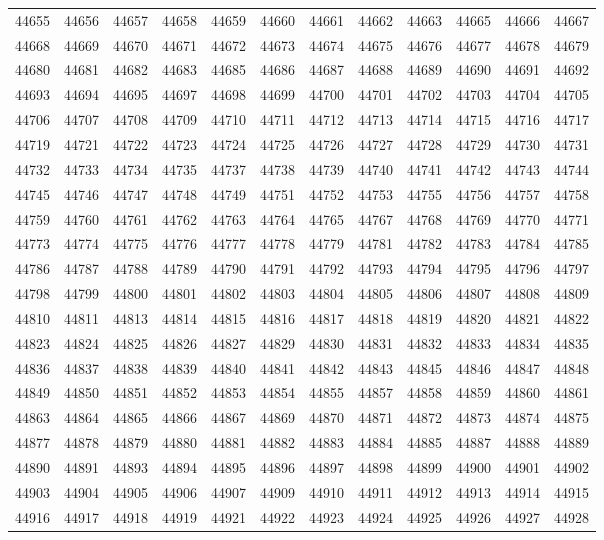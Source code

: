 \begin{center}
\begin{longtable}{llllllllllll}
44655 &44656 &44657 &44658 &44659 &44660 &44661 &44662 &44663 &44665 &44666 &44667 \\
44668 &44669 &44670 &44671 &44672 &44673 &44674 &44675 &44676 &44677 &44678 &44679 \\
44680 &44681 &44682 &44683 &44685 &44686 &44687 &44688 &44689 &44690 &44691 &44692 \\
44693 &44694 &44695 &44697 &44698 &44699 &44700 &44701 &44702 &44703 &44704 &44705 \\
44706 &44707 &44708 &44709 &44710 &44711 &44712 &44713 &44714 &44715 &44716 &44717 \\
44719 &44721 &44722 &44723 &44724 &44725 &44726 &44727 &44728 &44729 &44730 &44731 \\
44732 &44733 &44734 &44735 &44737 &44738 &44739 &44740 &44741 &44742 &44743 &44744 \\
44745 &44746 &44747 &44748 &44749 &44751 &44752 &44753 &44755 &44756 &44757 &44758 \\
44759 &44760 &44761 &44762 &44763 &44764 &44765 &44767 &44768 &44769 &44770 &44771 \\
44773 &44774 &44775 &44776 &44777 &44778 &44779 &44781 &44782 &44783 &44784 &44785 \\
44786 &44787 &44788 &44789 &44790 &44791 &44792 &44793 &44794 &44795 &44796 &44797 \\
44798 &44799 &44800 &44801 &44802 &44803 &44804 &44805 &44806 &44807 &44808 &44809 \\
44810 &44811 &44813 &44814 &44815 &44816 &44817 &44818 &44819 &44820 &44821 &44822 \\
44823 &44824 &44825 &44826 &44827 &44829 &44830 &44831 &44832 &44833 &44834 &44835 \\
44836 &44837 &44838 &44839 &44840 &44841 &44842 &44843 &44845 &44846 &44847 &44848 \\
44849 &44850 &44851 &44852 &44853 &44854 &44855 &44857 &44858 &44859 &44860 &44861 \\
44863 &44864 &44865 &44866 &44867 &44869 &44870 &44871 &44872 &44873 &44874 &44875 \\
44877 &44878 &44879 &44880 &44881 &44882 &44883 &44884 &44885 &44887 &44888 &44889 \\
44890 &44891 &44893 &44894 &44895 &44896 &44897 &44898 &44899 &44900 &44901 &44902 \\
44903 &44904 &44905 &44906 &44907 &44909 &44910 &44911 &44912 &44913 &44914 &44915 \\
44916 &44917 &44918 &44919 &44921 &44922 &44923 &44924 &44925 &44926 &44927 &44928 \\

\end{longtable}
\end{center}
